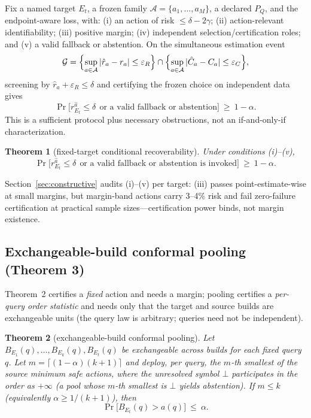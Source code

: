\documentclass{article}
\newtheorem{theorem}{Theorem}
\renewcommand{\Pr}{\mathop{\mathrm{Pr}}}   %
\newcommand{\Acal}{\mathcal{A}}
\begin{document}
Fix a named target $E_t$, a frozen family $\Acal=\{a_1,\dots,a_M\}$, a declared $P_Q$, and the
endpoint-aware loss, with: (i) an action of risk $\le\delta-2\gamma$; (ii) action-relevant
identifiability; (iii) positive margin; (iv) independent selection/certification roles; and (v) a valid
fallback or abstention. On the simultaneous estimation event
\begin{equation}
\mathcal{G}
=\Bigl\{\sup_{a\in\Acal}|\hat r_{a}-r_{a}|\le\varepsilon_{R}\Bigr\}
\cap\Bigl\{\sup_{a\in\Acal}|\hat C_{a}-C_{a}|\le\varepsilon_{C}\Bigr\},
\label{eq:eventG}
\end{equation}
screening by $\hat r_{a}+\varepsilon_{R}\le\delta$ and certifying the frozen choice on independent data
gives
\begin{equation}
\Pr\bigl[r_{E_{t}}^{\hat a}\le\delta\ \ \text{or a valid fallback or abstention}\bigr]\ \ge\ 1-\alpha.
\label{eq:thm2}
\end{equation}
This is a sufficient protocol plus necessary obstructions, not an if-and-only-if characterization.
\begin{theorem}[fixed-target conditional recoverability]
\label{thm:recover}
Under conditions (i)--(v),
\begin{equation}
\Pr\bigl[r_{E_{t}}^{\hat a}\le\delta\ \ \text{or a valid fallback or abstention is invoked}\bigr]\ \ge\ 1-\alpha.
\label{eq:thm2env}
\end{equation}
\end{theorem}
Section~\ref{sec:constructive} audits (i)--(v) per target: (iii) passes point-estimate-wise at small
margins, but margin-band actions carry 3--4\% risk and fail zero-failure certification at practical sample
sizes---certification power binds, not margin existence.

\subsection{Exchangeable-build conformal pooling (Theorem 3)}
\label{sec:thm3}

Theorem~2 certifies a \emph{fixed} action and needs a margin; pooling certifies a \emph{per-query order
statistic} and needs only that the target and source builds are exchangeable units (the query law is
arbitrary; queries need not be independent).

\begin{theorem}[exchangeable-build conformal pooling]
Let $B_{E_1}(q),\dots,B_{E_k}(q),B_{E_t}(q)$ be exchangeable across builds for each fixed query $q$.
Let $m=\lceil(1-\alpha)(k+1)\rceil$ and deploy, per query, the $m$-th smallest of the source minimum safe
actions, where the unresolved symbol $\bot$ participates in the order as $+\infty$ (a pool whose $m$-th
smallest is $\bot$ yields abstention). If $m\le k$ (equivalently $\alpha\ge 1/(k+1)$), then
\begin{equation}
\Pr\bigl[B_{E_t}(q)>a(q)\bigr]\ \le\ \alpha.
\label{eq:thm3}
\end{equation}
\end{theorem}
\end{document}
